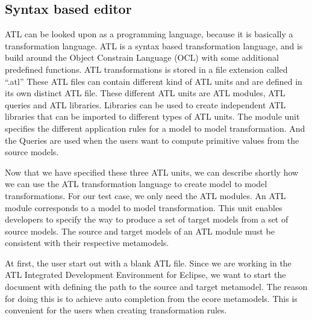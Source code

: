 \documentclass[pdftex,11pt,a4paper]{article}
\begin{document}
\subsection{Syntax based editor}

\noindent ATL can be looked upon as a programming language, because it is
basically a transformation language. ATL is a syntax based transformation
language, and is build around the Object Constrain Language (OCL) \cite{OCL}
with some additional predefined functions. ATL transformations is stored in a
file extension called ``.atl'' These ATL files can contain different kind of
ATL units and are defined in its own distinct ATL file. These different ATL
units are ATL modules, ATL queries and ATL libraries. Libraries can be used to
create independent ATL libraries that can be imported to different types of ATL
units. The module unit specifies the different application rules for a model to
model transformation. And the Queries are used when the users want to compute
primitive values from the source models.

Now that we have specified these three ATL units, we can describe shortly how
we can use the ATL transformation language to create model to model
transformations. For our test case, we only need the ATL modules. An ATL module
corresponds to a model to model transformation. This unit enables developers to
specify the way to produce a set of target models from a set of source models.
The source and target models of an ATL module must be consistent with their
respective metamodels. 

At first, the user start out with a blank ATL file. Since we are working in
the ATL Integrated Development Environment for Eclipse, we want to start the
document with defining the path to the source and target metamodel. The
reason for doing this is to achieve auto completion from the ecore metamodels.
This is convenient for the users when creating transformation rules. 
\end{document}
